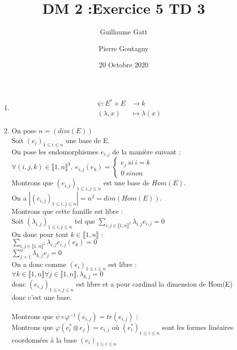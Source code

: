 \documentclass{article}
\title{DM 2 :Exercice 5 TD 3}
\author{Guillaume Gatt \and Pierre Goutagny}
\date{20 Octobre 2020}
\begin{document}
\thispagestyle{empty}
\begin{enumerate}[1., start=1]
    \item \begin{align*}
            \psi \colon E^{\ast} \times E &\longrightarrow k \\
                   (\lambda, x) &\longmapsto \lambda(x)
          \end{align*}

    \item
    On pose $n=(dim(E))$ \\
   Soit $(e_i)_{ 1\leq i \leq n}$ une base de E. \\
   On pose les endomorphismes $e_{i,j}$ de la manière suivant : \\
   $\forall (i,j,k) \in \llbracket 1,n\rrbracket^3,\ e_{i,j}(e_k)=\begin{cases}
   e_j \ si \ i=k \\
   0 \ sinon
   \end{cases}$ \\
   Montrons que $(e_{i,j})_{ 1\leq i,j \leq n}$ est une base de $Hom(E)$. \\
   On a $|(e_{i,j})_{ 1\leq i,j \leq n}|=n^2=dim(Hom(E))$. \\
   Montrons que cette famille est libre : \\
   Soit $(\lambda_{i,j})_{1 \leq i,j \leq n}$ tel que $\sum_{i,j \in \llbracket 1 , n \rrbracket^2} \lambda_{i,j} e_{i,j} =0$ \\
   On donc pour tout $k \in \llbracket1,n\rrbracket$ : \\
   $\sum_{i,j \in \llbracket 1 , n \rrbracket^2} \lambda_{i,j} e_{i,j}(e_k) =0$ \\
   $\sum_{j=1}^{n} \lambda_{k,j} e_j =0$ \\
   On a donc comme $(e_i)_{ 1\leq i \leq n}$ est libre : \\
   $\forall k \in \llbracket1,n\rrbracket \forall j \in \llbracket 1,n \rrbracket, \lambda_{k,j}=0$ \\
   donc $(e_{i,j})_{ 1\leq i,j \leq n}$ est libre et a pour cardinal la dimension de Hom(E) donc c'est une base. \\ \\
   Montrons que $\overline{\psi} \circ \varphi^{-1}(e_{i,j})=tr(e_{i,j})$ : \\
   Montrons que $\varphi(e^\ast_i \otimes e_{j})= e_{i,j}$ où $(e^*_i)_{ 1\leq i\leq n}$ sont les formes linéaires coordonnées à la base $(e_i)_{ 1\leq i \leq n}$ \\

\end{enumerate}
\end{document}
